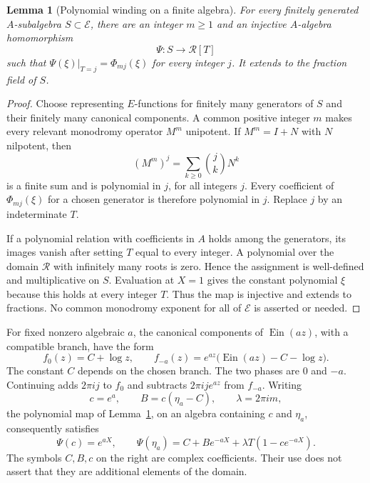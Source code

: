 \documentclass[11pt,a4paper]{article}
\numberwithin{equation}{section}
\newtheorem{lemma}[theorem]{Lemma}
\theoremstyle{definition}
\theoremstyle{remark}
\begin{document}
\begin{lemma}[Polynomial winding on a finite algebra]
\label{ev:polynomial-winding}
For every finitely generated $A$-subalgebra $S\subset\mathcal E$, there
are an integer $m\ge1$ and an injective $A$-algebra homomorphism
\[
 \Psi:S\longrightarrow\mathcal R[T]
\]
such that $\Psi(\xi)|_{T=j}=\Phi_{mj}(\xi)$ for every integer $j$.
It extends to the fraction field of $S$.
\end{lemma}
\begin{proof}
Choose representing $E$-functions for finitely many generators of $S$
and their finitely many canonical components.  A common positive
integer $m$ makes every relevant monodromy operator $M^m$ unipotent.
If $M^m=I+N$ with $N$ nilpotent, then
\[
 (M^m)^j=\sum_{k\ge0}\binom jk N^k
\]
is a finite sum and is polynomial in $j$, for all integers $j$.
Every coefficient of $\Phi_{mj}(\xi)$ for a chosen generator is
therefore polynomial in $j$.  Replace $j$ by an indeterminate $T$.

If a polynomial relation with coefficients in $A$ holds among the
generators, its images vanish after setting $T$ equal to every integer.
A polynomial over the domain $\mathcal R$ with infinitely many roots
is zero.  Hence the assignment is well-defined and multiplicative on
$S$.  Evaluation at $X=1$ gives the constant polynomial $\xi$ because
this holds at every integer $T$.  Thus the map is injective and extends
to fractions.  No common monodromy exponent for all of $\mathcal E$
is asserted or needed.
\end{proof}

For fixed nonzero algebraic $a$, the canonical components of
$\operatorname{Ein}(az)$, with a compatible branch, have the form
\[
 f_0(z)=C+\log z,
 \qquad
 f_{-a}(z)=e^{az}\bigl(\operatorname{Ein}(az)-C-\log z\bigr).
\]
The constant $C$ depends on the chosen branch.  The two phases are
$0$ and $-a$.  Continuing adds $2\pi i j$ to $f_0$ and subtracts
$2\pi i j e^{az}$ from $f_{-a}$.  Writing
\[
 c=e^a,\qquad B=c(\eta_a-C),\qquad \lambda=2\pi i m,
\]
the polynomial map of Lemma~\ref{ev:polynomial-winding}, on an algebra
containing $c$ and $\eta_a$, consequently satisfies
\begin{equation}\label{ev:eta-polynomial-image}
 \Psi(c)=e^{aX},\qquad
 \Psi(\eta_a)
 =C+Be^{-aX}+\lambda T(1-ce^{-aX}).
\end{equation}
The symbols $C,B,c$ on the right are complex coefficients.  Their use
does not assert that they are additional elements of the domain.
\end{document}

